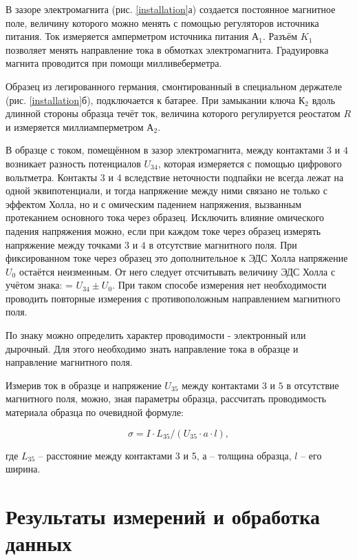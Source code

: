 \documentclass[a4paper, 12pt]{article}
\begin{document}
    В зазоре электромагнита (рис. \ref{installation}а) создается постоянное магнитное поле, величину которого можно менять с помощью регуляторов источника питания. Ток измеряется амперметром источника питания $А_1$. Разъём $K_1$ позволяет менять направление тока в обмотках электромагнита. Градуировка магнита проводится при помощи милливеберметра.
    
    Образец из легированного германия, смонтированный в специальном держателе (рис. \ref{installation}б), подключается к батарее. При замыкании ключа $К_2$ вдоль длинной стороны образца течёт ток, величина которого регулируется реостатом $R$ и измеряется миллиамперметром $А_2$. 
    
    В образце с током, помещённом в зазор электромагнита, между контактами $3$ и $4$ возникает разность потенциалов $U_{34}$, которая измеряется с помощью цифрового вольтметра. Контакты $3$ и $4$ вследствие неточности подпайки не всегда лежат на одной эквипотенциали, и тогда напряжение между ними связано не только с эффектом Холла, но и с омическим падением напряжения, вызванным протеканием основного тока через образец. Исключить влияние омического падения напряжения можно, если при каждом токе через образец измерять напряжение между точками $3$ и $4$ в отсутствие магнитного поля. При фиксированном токе через образец это дополнительное к ЭДС Холла напряжение $U_0$ остаётся неизменным. От него следует отсчитывать величину ЭДС Холла с учётом знака: = $U_{34} \pm U_0$. При таком способе измерения нет необходимости проводить повторные измерения с противоположным направлением магнитного поля.
    
    По знаку можно определить характер проводимости - электронный или дырочный. Для этого необходимо знать направление тока в образце и направление магнитного поля.
    
    Измерив ток в образце и напряжение $U_{35}$ между контактами $3$ и $5$ в отсутствие магнитного поля, можно, зная параметры образца, рассчитать проводимость материала образца по очевидной формуле:

    \begin{equation}
        \sigma = I \cdot L_{35} / \left( U_{35} \cdot a \cdot l \right), 
        \label{eq_sigma}
    \end{equation}
    
    где $L_{35}$ -- расстояние между контактами 3 и 5, $а$ -- толщина образца, $l$ -- его ширина.

    \section{Результаты измерений и обработка данных}
\end{document}
